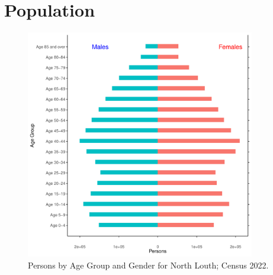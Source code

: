 \documentclass{article}
\begin{document}
\pagebreak

\section{Population} 
\label{sect:Pop}

\begin{figure}[h]
	\centering
	\includegraphics[width = 100mm]{../figures/PyramidPlot.pdf}
	\caption{Persons by Age Group and Gender for North Louth; Census 2022.}
	\label{fig:2ae19629-1a6a-13a3-e055-000000000001}
	\end{figure}
\end{document}
